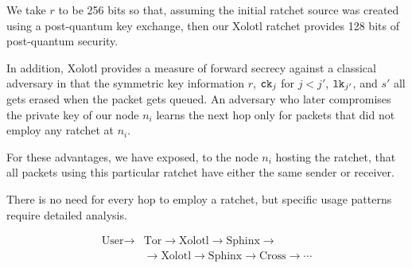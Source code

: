 \documentclass[twoside,letterpaper]{llncs}
\begin{document}
\begin{figure}[b!]%
\end{figure}

\smallskip

We take $r$ to be 256 bits so that, assuming the initial ratchet
source was created using a post-quantum key exchange, then our
Xolotl ratchet provides 128 bits of post-quantum security.

In addition, Xolotl provides a measure of forward secrecy against
a classical adversary in that the symmetric key information $r$,
$\texttt{ck}_j$ for $j<j'$, $\texttt{lk}_{j'}$, and $s'$ all gets erased when
the packet gets queued.  An adversary who later compromises the
private key of our node $n_i$ learns the next hop only for packets
that did not employ any ratchet at $n_i$.

For these advantages, we have exposed,
 to the node $n_i$ hosting the ratchet, that all packets using this
particular ratchet have either the same sender or receiver.

There is no need for every hop to employ a ratchet, %
but specific usage patterns require detailed analysis. 

\[ \begin{aligned}
\textrm{User} \to &\textrm{Tor} \to \textrm{Xolotl} \to \textrm{Sphinx} \to \\
\quad &\to \textrm{Xolotl} \to \textrm{Sphinx} \to \textrm{Cross} \to \cdots 
\end{aligned} \]
\end{document}
